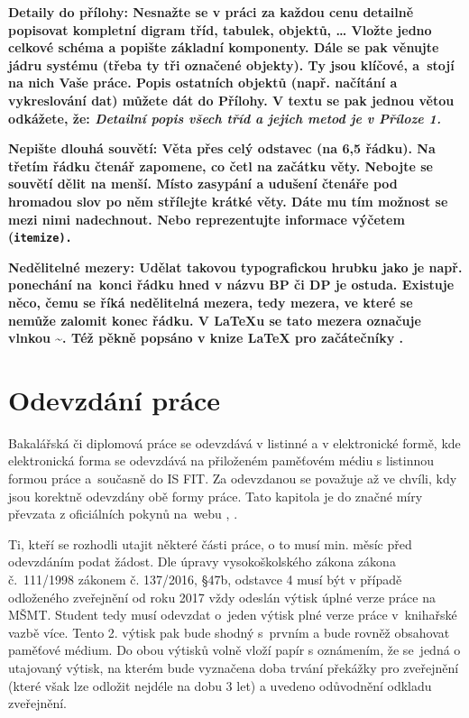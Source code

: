 \bf Detaily do přílohy: \rm Nesnažte se v práci za každou cenu detailně popisovat kompletní digram tříd, tabulek, objektů, \ldots{} Vložte jedno celkové schéma a popište základní komponenty. Dále se pak věnujte jádru systému (třeba ty tři označené objekty). Ty jsou klíčové, a~stojí na nich Vaše práce. Popis ostatních  objektů (např. načítání a vykreslování dat) můžete dát do Přílohy. V textu se pak jednou větou odkážete, že: \it Detailní popis všech tříd a jejich metod je v Příloze 1. \rm

\bf Nepište dlouhá souvětí: \rm Věta přes celý odstavec (na 6,5 řádku). Na třetím řádku čtenář zapomene, co četl na začátku věty. Nebojte se souvětí dělit na menší. Místo zasypání a udušení čtenáře pod hromadou slov po něm střílejte krátké věty. Dáte mu tím možnost se mezi nimi nadechnout. Nebo reprezentujte informace výčetem (\tt itemize\rm ).

\bf Nedělitelné mezery: \rm Udělat takovou typografickou hrubku jako je např. ponechání  na~konci řádku hned v názvu BP či DP je ostuda. Existuje něco, čemu se říká nedělitelná mezera, tedy mezera, ve které se nemůže zalomit konec řádku. V \LaTeX{}u se tato mezera označuje vlnkou \textasciitilde. Též pěkně popsáno v knize {\LaTeX} pro začátečníky \cite{Rybicka}.

\chapter{Odevzdání práce}
\label{odevzdani}

Bakalářská či diplomová práce se odevzdává v listinné a v elektronické formě, kde elektronická forma se odevzdává na přiloženém paměťovém médiu s listinnou formou práce a~současně do IS FIT. Za odevzdanou se považuje až ve chvíli, kdy jsou korektně odevzdány obě formy práce. Tato kapitola je do značné míry převzata z oficiálních pokynů na~webu \cite{formalniBP}, \cite{formalniDP}.

Ti, kteří se rozhodli utajit některé části práce, o to musí min. měsíc před odevzdáním podat žádost. Dle úpravy vysokoškolského zákona zákona č.~111/1998 zákonem č. 137/2016, \S 47b, odstavce 4 musí být v případě odloženého zveřejnění od roku 2017 vždy odeslán výtisk úplné verze práce na MŠMT. Student tedy musí odevzdat o~jeden výtisk plné verze práce v~knihařské vazbě více. Tento 2. výtisk pak bude shodný s~prvním a bude rovněž obsahovat paměťové médium. Do obou výtisků volně vloží papír s oznámením, že se~jedná o utajovaný výtisk, na kterém bude vyznačena doba trvání překážky pro zveřejnění (které však lze odložit nejdéle na dobu 3 let) a uvedeno odůvodnění odkladu zveřejnění.

